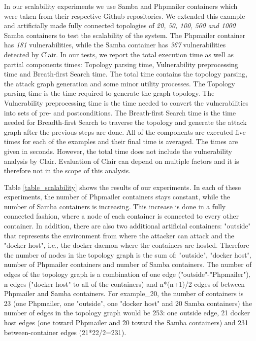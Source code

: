 In our scalability experiments we use Samba \cite{samba} and Phpmailer \cite{phpmailer} containers which were taken from their respective Github repositories. We extended this example and artificially made fully connected topologies of \textit{20, 50, 100, 500 and 1000} Samba containers to test the scalability of the system. The Phpmailer container has \textit{181} vulnerabilities, while the Samba container has \textit{367} vulnerabilities detected by Clair. In our tests, we report the total execution time as well as partial components times: Topology parsing time, Vulnerability preprocessing time and Breath-first Search time. The total time contains the topology parsing, the attack graph generation and some minor utility processes. The Topology parsing time is the time required to generate the graph topology. The Vulnerability preprocessing time is the time needed to convert the vulnerabilities into sets of pre- and postconditions. The Breath-first Search time is the time needed for Breadth-first Search to traverse the topology and generate the attack graph after the previous steps are done. All of the components are executed five times for each of the examples and their final time is averaged. The times are given in seconds.  However, the total time does not include the vulnerability analysis by Clair. Evaluation of Clair can depend on multiple factors and it is therefore not in the scope of this analysis.

Table \ref{table_scalability} shows the results of our experiments. In each of these experiments, the number of Phpmailer containers stays constant, while the number of Samba containers is increasing. This increase is done in a fully connected fashion, where a node of each container is connected to every other container. In addition, there are also two additional artificial containers: "outside" that represents the environment from where the attacker can attack and the "docker host", i.e., the docker daemon where the containers are hosted. Therefore the number of nodes in the topology graph is the sum of: "outside", "docker host", number of Phpmailer containers and number of Samba containers. The number of edges of the topology graph is a combination of one edge ("outside"-"Phpmailer"), n edges ("docker host" to all of the containers) and n*(n+1)/2 edges of between Phpmailer and Samba containers. For example\_20, the number of containers is 23 (one Phpmailer, one "outside", one "docker host" and 20 Samba containers) the number of edges in the topology graph would be 253: one outside edge, 21 docker host edges (one toward Phpmailer and 20 toward the Samba containers) and 231 between-container edges (21*22/2=231).

